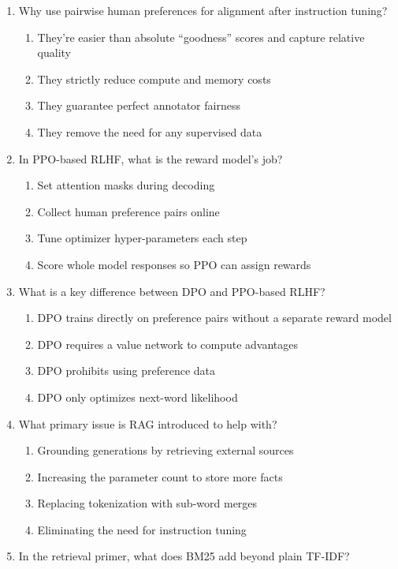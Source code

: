 \documentclass[12pt]{article}
\begin{document}
\begin{enumerate}[label=Q\arabic*.]
\item Why use pairwise human preferences for alignment after instruction tuning?
\begin{enumerate}[label=(\Alph*)]
    \item They're easier than absolute ``goodness'' scores and capture relative quality
    \item They strictly reduce compute and memory costs
    \item They guarantee perfect annotator fairness
    \item They remove the need for any supervised data
\end{enumerate}
\item In PPO-based RLHF, what is the reward model's job?
\begin{enumerate}[label=(\Alph*)]
    \item Set attention masks during decoding
    \item Collect human preference pairs online
    \item Tune optimizer hyper-parameters each step
    \item Score whole model responses so PPO can assign rewards
\end{enumerate}
\item What is a key difference between DPO and PPO-based RLHF?
\begin{enumerate}[label=(\Alph*)]
    \item DPO trains directly on preference pairs without a separate reward model
    \item DPO requires a value network to compute advantages
    \item DPO prohibits using preference data
    \item DPO only optimizes next-word likelihood
\end{enumerate}
\item What primary issue is RAG introduced to help with?
\begin{enumerate}[label=(\Alph*)]
    \item Grounding generations by retrieving external sources
    \item Increasing the parameter count to store more facts
    \item Replacing tokenization with sub-word merges
    \item Eliminating the need for instruction tuning
\end{enumerate}
\item In the retrieval primer, what does BM25 add beyond plain TF-IDF?

\end{enumerate}
\end{document}

